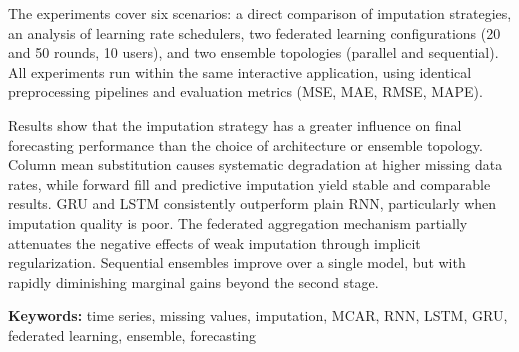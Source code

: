 The experiments cover six scenarios: a direct comparison of imputation strategies, an analysis of learning rate schedulers, two federated learning configurations (20 and 50 rounds, 10 users), and two ensemble topologies (parallel and sequential). All experiments run within the same interactive application, using identical preprocessing pipelines and evaluation metrics (MSE, MAE, RMSE, MAPE).

Results show that the imputation strategy has a greater influence on final forecasting performance than the choice of architecture or ensemble topology. Column mean substitution causes systematic degradation at higher missing data rates, while forward fill and predictive imputation yield stable and comparable results. GRU and LSTM consistently outperform plain RNN, particularly when imputation quality is poor. The federated aggregation mechanism partially attenuates the negative effects of weak imputation through implicit regularization. Sequential ensembles improve over a single model, but with rapidly diminishing marginal gains beyond the second stage.

\vspace{1em}
\noindent\textbf{Keywords:} time series, missing values, imputation, MCAR, RNN, LSTM, GRU, federated learning, ensemble, forecasting
